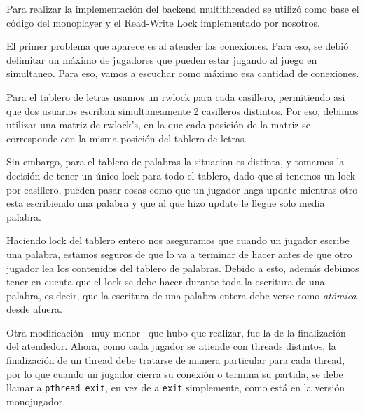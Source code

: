 
Para realizar la implementación del backend multithreaded se utilizó como base el código del monoplayer y el Read-Write Lock implementado por nosotros.

El primer problema que aparece es al atender las conexiones. Para eso, se debió delimitar un máximo de jugadores que pueden estar jugando al juego en simultaneo. Para eso, vamos a escuchar como máximo esa cantidad de conexiones.

Para el tablero de letras usamos un rwlock para cada casillero, permitiendo asi que dos usuarios escriban simultaneamente 2 casilleros distintos. Por eso, debimos utilizar una matriz de rwlock's, en la que cada posición de la matriz se corresponde con la misma posición del tablero de letras.

Sin embargo, para el tablero de palabras la situacion es distinta, y tomamos la decisión de tener un único lock para todo el tablero, dado que si tenemos un lock por casillero, pueden pasar cosas como que un jugador haga update mientras otro esta escribiendo una palabra y que al que hizo update le llegue solo media palabra.

Haciendo lock del tablero entero nos aseguramos que cuando un jugador escribe una palabra, estamos seguros de que lo va a terminar de hacer antes de que otro jugador lea los contenidos del tablero de palabras. Debido a esto, además debimos tener en cuenta que el lock se debe hacer durante toda la escritura de una palabra, es decir, que la escritura de una palabra entera debe verse como \emph{atómica} desde afuera.

Otra modificación --muy menor-- que hubo que realizar, fue la de la finalización del atendedor. Ahora, como cada jugador se atiende con threads distintos, la finalización de un thread debe tratarse de manera particular para cada thread, por lo que cuando un jugador cierra su conexión o termina su partida, se debe llamar a \texttt{pthread\_exit}, en vez de a \texttt{exit} simplemente, como está en la versión monojugador.


